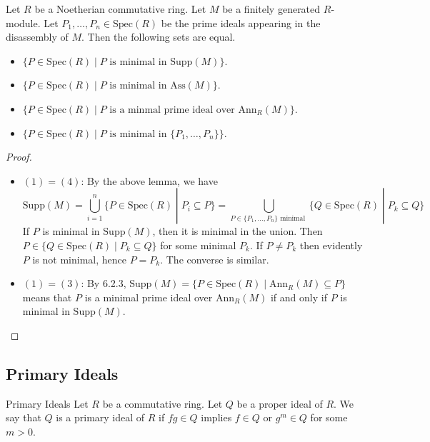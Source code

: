 \documentclass[a4paper]{article}
\begin{document}
\begin{prp}{}{} Let $R$ be a Noetherian commutative ring. Let $M$ be a finitely generated $R$-module. Let $P_1,\dots,P_n\in\text{Spec}(R)$ be the prime ideals appearing in the disassembly of $M$. Then the following sets are equal. 
\begin{itemize}
\item $\{P\in\text{Spec}(R)\;|\;P\text{ is minimal in }\text{Supp}(M)\}$. 
\item $\{P\in\text{Spec}(R)\;|\;P\text{ is minimal in }\text{Ass}(M)\}$. 
\item $\{P\in\text{Spec}(R)\;|\;P\text{ is a minmal prime ideal over }\text{Ann}_R(M)\}$. 
\item $\{P\in\text{Spec}(R)\;|\;P\text{ is minimal in }\{P_1,\dots,P_n\}\}$. 
\end{itemize} 
\begin{proof}~\\
\begin{itemize}
\item $(1)=(4)$: By the above lemma, we have $$\text{Supp}(M)=\bigcup_{i=1}^n\{P\in\text{Spec}(R)\;|\;P_i\subseteq P\}=\bigcup_{P\in\{P_1,\dots,P_n\}\text{ minimal }}\{Q\in\text{Spec}(R)\;|\;P_k\subseteq Q\}$$ If $P$ is minimal in $\text{Supp}(M)$, then it is minimal in the union. Then $P\in\{Q\in\text{Spec}(R)\;|\;P_k\subseteq Q\}$ for some minimal $P_k$. If $P\neq P_k$ then evidently $P$ is not minimal, hence $P=P_k$. The converse is similar. 
\item $(1)=(3)$: By 6.2.3, $\text{Supp}(M)=\{P\in\text{Spec}(R)\;|\;\text{Ann}_R(M)\subseteq P\}$ means that $P$ is a minimal prime ideal over $\text{Ann}_R(M)$ if and only if $P$ is minimal in $\text{Supp}(M)$. 
\end{itemize}
\end{proof}
\end{prp}

\subsection{Primary Ideals}
\begin{defn}{Primary Ideals}{} Let $R$ be a commutative ring. Let $Q$ be a proper ideal of $R$. We say that $Q$ is a primary ideal of $R$ if $fg\in Q$ implies $f\in Q$ or $g^m\in Q$ for some $m>0$. 
\end{defn}
\end{document}
